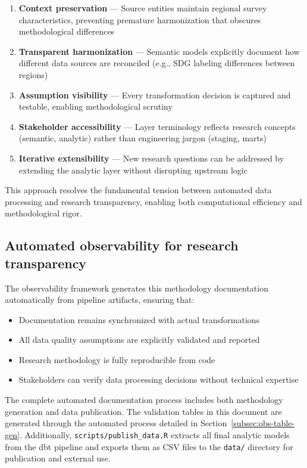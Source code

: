 \documentclass{article}
\begin{document}
\begin{enumerate}
    \item \textbf{Context preservation} — Source entities maintain regional survey characteristics, preventing premature harmonization that obscures methodological differences
    \item \textbf{Transparent harmonization} — Semantic models explicitly document how different data sources are reconciled (e.g., SDG labeling differences between regions)
    \item \textbf{Assumption visibility} — Every transformation decision is captured and testable, enabling methodological scrutiny
    \item \textbf{Stakeholder accessibility} — Layer terminology reflects research concepts (semantic, analytic) rather than engineering jargon (staging, marts)
    \item \textbf{Iterative extensibility} — New research questions can be addressed by extending the analytic layer without disrupting upstream logic
\end{enumerate}

This approach resolves the fundamental tension between automated data processing and research transparency, enabling both computational efficiency and methodological rigor.

\subsection{Automated observability for research transparency}

The observability framework generates this methodology documentation automatically from pipeline artifacts, ensuring that:
\begin{itemize}
    \item Documentation remains synchronized with actual transformations
    \item All data quality assumptions are explicitly validated and reported
    \item Research methodology is fully reproducible from code
    \item Stakeholders can verify data processing decisions without technical expertise
\end{itemize}

The complete automated documentation process includes both methodology generation and data publication. The validation tables in this document are generated through the automated process detailed in Section~\ref{subsec:obs-table-gen}. Additionally, \texttt{scripts/publish\_data.R} extracts all final analytic models from the dbt pipeline and exports them as CSV files to the \texttt{data/} directory for publication and external use.
\end{document}
